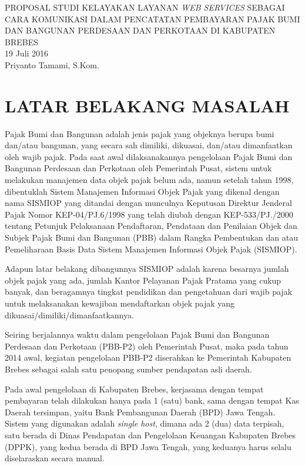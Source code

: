 \documentclass[pdftex, 12pt, oneside]{article}
\begin{document}
\begin{center}
{\large PROPOSAL STUDI KELAYAKAN LAYANAN \textit{WEB SERVICES} SEBAGAI CARA KOMUNIKASI DALAM PENCATATAN PEMBAYARAN PAJAK BUMI DAN BANGUNAN PERDESAAN DAN PERKOTAAN DI KABUPATEN BREBES}\\[1cm]
19 Juli 2016\\
Priyanto Tamami, S.Kom.
\end{center}

\section{LATAR BELAKANG MASALAH}

Pajak Bumi dan Bangunan adalah jenis pajak yang objeknya berupa bumi dan/atau bangunan, yang secara sah dimiliki, dikuasai, dan/atau dimanfaatkan oleh wajib pajak. Pada saat awal dilaksanakannya pengelolaan Pajak Bumi dan Bangunan Perdesaan dan Perkotaan oleh Pemerintah Pusat, sistem untuk melakukan manajemen data objek pajak belum ada, namun setelah tahun 1998, dibentuklah Sistem Manajemen Informasi Objek Pajak yang dikenal dengan nama SISMIOP yang ditandai dengan munculnya Keputusan Direktur Jenderal Pajak Nomor KEP-04/PJ.6/1998 yang telah diubah dengan KEP-533/PJ./2000 tentang Petunjuk Pelaksanaan Pendaftaran, Pendataan dan Penilaian Objek dan Subjek Pajak Bumi dan Bangunan (PBB) dalam Rangka Pembentukan dan atau Pemeliharaan Basis Data Sistem Manajemen Informasi Objek Pajak (SISMIOP).

Adapun latar belakang dibangunnya SISMIOP adalah karena besarnya jumlah objek pajak yang ada, jumlah Kantor Pelayanan Pajak Pratama yang cukup banyak, dan beragamnya tingkat pendidikan dan pengetahuan dari wajib pajak untuk melaksanakan kewajiban mendaftarkan objek pajak yang dikuasai/dimiliki/dimanfaatkannya.

Seiring berjalannya waktu dalam pengelolaan Pajak Bumi dan Bangunan Perdesaan dan Perkotaan (PBB-P2) oleh Pemerintah Pusat, maka pada tahun 2014 awal, kegiatan pengelolaan PBB-P2 diserahkan ke Pemerintah Kabupaten Brebes sebagai salah satu penopang sumber pendapatan asli daerah.

Pada awal pengelolaan di Kabupaten Brebes, kerjasama dengan tempat pembayaran telah dilakukan hanya pada 1 (satu) bank, sama dengan tempat Kas Daerah tersimpan, yaitu Bank Pembangunan Daerah (BPD) Jawa Tengah. Sistem yang digunakan adalah \textit{single host}, dimana ada 2 (dua) data terpisah, satu berada di Dinas Pendapatan dan Pengelolaan Keuangan Kabupaten Brebes (DPPK), yang kedua berada di BPD Jawa Tengah, yang keduanya harus selalu diselaraskan secara manual.
\end{document}
